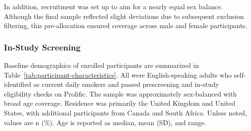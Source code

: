 In addition, recruitment was set up to aim for a nearly equal sex balance. Although the final sample reflected slight deviations due to subsequent exclusion filtering, this pre-allocation ensured coverage across male and female participants.

\subsubsection{In-Study Screening}

\noindent Baseline demographics of enrolled participants are summarized in Table~\ref{tab:participant-characteristics}. All were English-speaking adults who self-identified as current daily smokers and passed prescreening and in-study eligibility checks on Prolific. The sample was approximately sex-balanced with broad age coverage. Residence was primarily the United Kingdom and United States, with additional participants from Canada and South Africa. Unless noted, values are n (\%). Age is reported as median, mean (SD), and range. 

